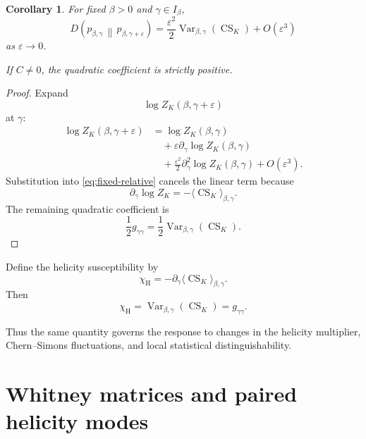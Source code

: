 \documentclass[11pt]{article}
\newtheorem{corollary}[theorem]{Corollary}
\theoremstyle{definition}
\theoremstyle{remark}
\newcommand{\CS}{\operatorname{CS}}
\newcommand{\Var}{\operatorname{Var}}
\begin{document}
\begin{corollary}
\label{cor:local}
For fixed \(\beta>0\) and \(\gamma\in I_\beta\),
\begin{equation}
D\left(
p_{\beta,\gamma}
\,\middle\|\,
p_{\beta,\gamma+\varepsilon}
\right)
=
\frac{\varepsilon^2}{2}
\Var_{\beta,\gamma}(\CS_K)
+
O(\varepsilon^3)
\label{eq:local}
\end{equation}
as \(\varepsilon\to0\).

If \(C\neq0\), the quadratic coefficient is strictly
positive.
\end{corollary}

\begin{proof}
Expand
\begin{equation}
\log Z_K(\beta,\gamma+\varepsilon)
\end{equation}
at \(\gamma\):
\begin{align}
\log Z_K(\beta,\gamma+\varepsilon)
&=
\log Z_K(\beta,\gamma)
\nonumber\\
&\quad+
\varepsilon
\partial_\gamma\log Z_K(\beta,\gamma)
\nonumber\\
&\quad+
\frac{\varepsilon^2}{2}
\partial_\gamma^2\log Z_K(\beta,\gamma)
+
O(\varepsilon^3).
\end{align}
Substitution into \eqref{eq:fixed-relative} cancels the
linear term because
\begin{equation}
\partial_\gamma\log Z_K
=
-\langle\CS_K\rangle_{\beta,\gamma}.
\end{equation}
The remaining quadratic coefficient is
\begin{equation}
\frac12g_{\gamma\gamma}
=
\frac12
\Var_{\beta,\gamma}(\CS_K).
\end{equation}
\end{proof}

Define the helicity susceptibility by
\begin{equation}
\chi_{\mathrm H}
=
-\partial_\gamma
\langle\CS_K\rangle_{\beta,\gamma}.
\label{eq:susceptibility-definition}
\end{equation}
Then
\begin{equation}
\boxed{
\chi_{\mathrm H}
=
\Var_{\beta,\gamma}(\CS_K)
=
g_{\gamma\gamma}.
}
\label{eq:main-identity}
\end{equation}

Thus the same quantity governs the response to changes in
the helicity multiplier, Chern--Simons fluctuations, and
local statistical distinguishability.

\section{Whitney matrices and paired helicity modes}
\end{document}
